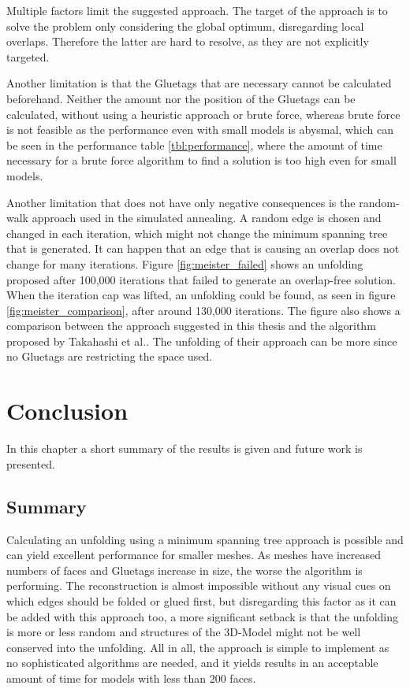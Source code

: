 \documentclass[draft,final]{vutinfth} %
\begin{document}
Multiple factors limit the suggested approach. The target of the approach is to solve the problem only considering the global optimum, disregarding local overlaps. Therefore the latter are hard to resolve, as they are not explicitly targeted.

Another limitation is that the Gluetags that are necessary cannot be calculated beforehand. Neither the amount nor the position of the Gluetags can be calculated, without using a heuristic approach or brute force, whereas brute force is not feasible as the performance even with small models is abysmal, which can be seen in the performance table \ref{tbl:performance}, where the amount of time necessary for a brute force algorithm to find a solution is too high even for small models. 

Another limitation that does not have only negative consequences is the random-walk approach used in the simulated annealing. A random edge is chosen and changed in each iteration, which might not change the minimum spanning tree that is generated. It can happen that an edge that is causing an overlap does not change for many iterations. Figure \ref{fig:meister_failed} shows an unfolding proposed after 100,000 iterations that failed to generate an overlap-free solution. When the iteration cap was lifted, an unfolding could be found, as seen in figure \ref{fig:meister_comparison}, after around 130,000 iterations. The figure also shows a comparison between the approach suggested in this thesis and the algorithm proposed by Takahashi et al.\cite{takahashi2011optimized}. The unfolding of their approach can be more since no Gluetags are restricting the space used.

\chapter{Conclusion}
\label{chap:conclusion}
In this chapter a short summary of the results is given and future work is presented.

\section{Summary}
Calculating an unfolding using a minimum spanning tree approach is possible and can yield excellent performance for smaller meshes. As meshes have increased numbers of faces and Gluetags increase in size, the worse the algorithm is performing. The reconstruction is almost impossible without any visual cues on which edges should be folded or glued first, but disregarding this factor as it can be added with this approach too, a more significant setback is that the unfolding is more or less random and structures of the 3D-Model might not be well conserved into the unfolding. All in all, the approach is simple to implement as no sophisticated algorithms are needed, and it yields results in an acceptable amount of time for models with less than 200 faces.
\end{document}
